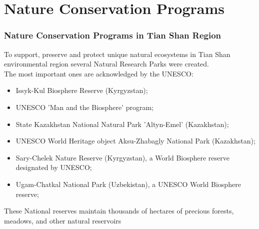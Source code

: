 \documentclass[pdflatex,compress,8pt,
	xcolor={dvipsnames,dvipsnames,svgnames,x11names,table},
	hyperref={colorlinks = true,
	breaklinks = true, 
	urlcolor = NavyBlue, 
	breaklinks = true}]{beamer}
\begin{document}
\section{Nature Conservation Programs}
\begin{frame}\frametitle{Nature Conservation Programs in Tian Shan Region}
To support, preserve and protect unique natural ecosystems in Tian Shan environmental region several Natural Research Parks were created. \\
The most important ones are acknowledged by the UNESCO:
\begin{itemize}
	\item Issyk-Kul Biosphere Reserve (Kyrgyzstan);
	\item UNESCO ’Man and the Biosphere’ program;
	\item State Kazakhstan National Natural Park ’Altyn-Emel’ (Kazakhstan);
	\item UNESCO World Heritage object Aksu-Zhabagly National Park (Kazakhstan);
	\item Sary-Chelek Nature Reserve (Kyrgyzstan), a World Biosphere reserve designated by UNESCO;
	\item Ugam-Chatkal National Park (Uzbekistan), a UNESCO World Biosphere reserve;
\end{itemize}
These National reserves maintain thousands of hectares of precious forests, meadows, and other natural reservoirs
\end{frame}
\end{document}
